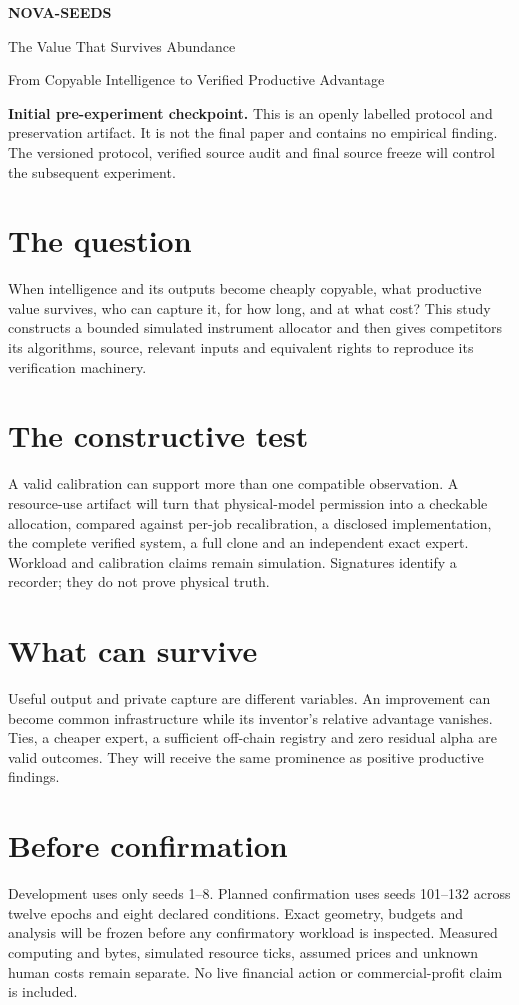 \documentclass[11pt]{article}
\begin{document}
\par\vspace{1cm}
{\Huge\bfseries NOVA-SEEDS}\par\vspace{0.2cm}
{\LARGE The Value That Survives Abundance}\par\vspace{0.3cm}
{\large From Copyable Intelligence to Verified Productive Advantage}\par\vspace{0.8cm}
\noindent\textbf{Initial pre-experiment checkpoint.} This is an openly labelled protocol and preservation artifact. It is not the final paper and contains no empirical finding. The versioned protocol, verified source audit and final source freeze will control the subsequent experiment.
\section*{The question}
When intelligence and its outputs become cheaply copyable, what productive value survives, who can capture it, for how long, and at what cost? This study constructs a bounded simulated instrument allocator and then gives competitors its algorithms, source, relevant inputs and equivalent rights to reproduce its verification machinery.
\section*{The constructive test}
A valid calibration can support more than one compatible observation. A resource-use artifact will turn that physical-model permission into a checkable allocation, compared against per-job recalibration, a disclosed implementation, the complete verified system, a full clone and an independent exact expert. Workload and calibration claims remain simulation. Signatures identify a recorder; they do not prove physical truth.
\section*{What can survive}
Useful output and private capture are different variables. An improvement can become common infrastructure while its inventor's relative advantage vanishes. Ties, a cheaper expert, a sufficient off-chain registry and zero residual alpha are valid outcomes. They will receive the same prominence as positive productive findings.
\section*{Before confirmation}
Development uses only seeds 1--8. Planned confirmation uses seeds 101--132 across twelve epochs and eight declared conditions. Exact geometry, budgets and analysis will be frozen before any confirmatory workload is inspected. Measured computing and bytes, simulated resource ticks, assumed prices and unknown human costs remain separate. No live financial action or commercial-profit claim is included.
\end{document}
